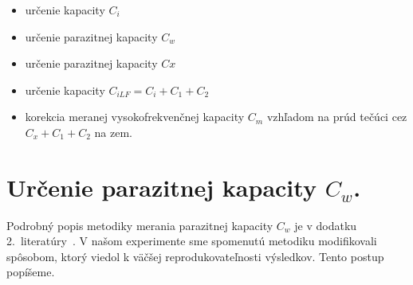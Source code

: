 \begin{itemize}
\item určenie kapacity $C_i$
\item určenie parazitnej kapacity $C_w$
\item určenie parazitnej kapacity $Cx$
\item určenie kapacity $C_{iLF}  = C_i  + C_1  + C_2$
\item korekcia meranej vysokofrekvenčnej kapacity $C_m$ vzhľadom na
  prúd tečúci cez $C_x + C_1 + C_2$ na zem.
\end{itemize}


\section{Určenie parazitnej kapacity $C_w$.}\label{sec:E.1}

Podrobný popis metodiky merania parazitnej kapacity $C_w$ je v dodatku
2.\ literatúry~\cite{App.2}. V našom experimente sme spomenutú
metodiku modifikovali spôsobom, ktorý viedol k väčšej
reprodukovateľnosti výsledkov. Tento postup popíšeme.

